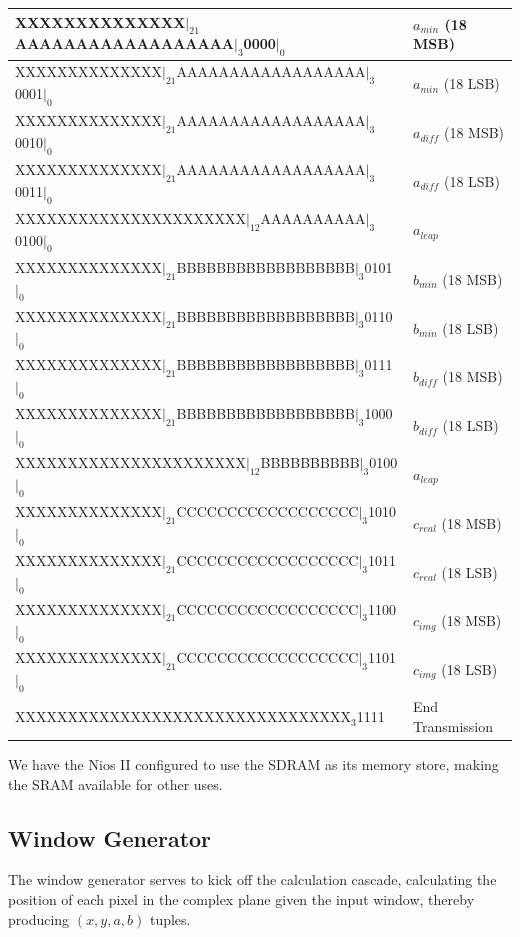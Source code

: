 \documentclass{article}
\begin{document}
\begin{tabular}{| l | l | }\\ \hline
XXXXXXXXXXXXXX$|_{21}$AAAAAAAAAAAAAAAAAA$|_3$0000$|_0$ & $a_{min}$ (18 MSB)\\ \hline
XXXXXXXXXXXXXX$|_{21}$AAAAAAAAAAAAAAAAAA$|_3$0001$|_0$ & $a_{min}$ (18 LSB)\\\hline
XXXXXXXXXXXXXX$|_{21}$AAAAAAAAAAAAAAAAAA$|_3$0010$|_0$ & $a_{diff}$ (18 MSB)\\\hline
XXXXXXXXXXXXXX$|_{21}$AAAAAAAAAAAAAAAAAA$|_3$0011$|_0$ & $a_{diff}$ (18 LSB)\\\hline
XXXXXXXXXXXXXXXXXXXXXX$|_{12}$AAAAAAAAAA$|_3$0100$|_0$ & $a_{leap}$ \\\hline
XXXXXXXXXXXXXX$|_{21}$BBBBBBBBBBBBBBBBBB$|_3$0101$|_0$ & $b_{min}$ (18 MSB)\\\hline
XXXXXXXXXXXXXX$|_{21}$BBBBBBBBBBBBBBBBBB$|_3$0110$|_0$ & $b_{min}$ (18 LSB)\\\hline
XXXXXXXXXXXXXX$|_{21}$BBBBBBBBBBBBBBBBBB$|_3$0111$|_0$ & $b_{diff}$ (18 MSB)\\\hline
XXXXXXXXXXXXXX$|_{21}$BBBBBBBBBBBBBBBBBB$|_3$1000$|_0$ & $b_{diff}$ (18 LSB)\\\hline
XXXXXXXXXXXXXXXXXXXXXX$|_{12}$BBBBBBBBBB$|_3$0100$|_0$ & $a_{leap}$ \\\hline
XXXXXXXXXXXXXX$|_{21}$CCCCCCCCCCCCCCCCCC$|_3$1010$|_0$ & $c_{real}$ (18 MSB)\\\hline
XXXXXXXXXXXXXX$|_{21}$CCCCCCCCCCCCCCCCCC$|_3$1011$|_0$ & $c_{real}$ (18 LSB)\\\hline
XXXXXXXXXXXXXX$|_{21}$CCCCCCCCCCCCCCCCCC$|_3$1100$|_0$ & $c_{img}$ (18 MSB)\\\hline
XXXXXXXXXXXXXX$|_{21}$CCCCCCCCCCCCCCCCCC$|_3$1101$|_0$ & $c_{img}$ (18 LSB)\\\hline
XXXXXXXXXXXXXXXXXXXXXXXXXXXXXXXX$_3$1111 & End Transmission\\\hline
\end{tabular}

We have the Nios II configured to use the SDRAM as its memory store, making the SRAM available for other uses.

\subsection{Window Generator}

The window generator serves to kick off the calculation cascade,
calculating the position of each pixel in the complex plane given the input window, thereby producing 
$(x, y, a, b)$ tuples. 
\end{document}
